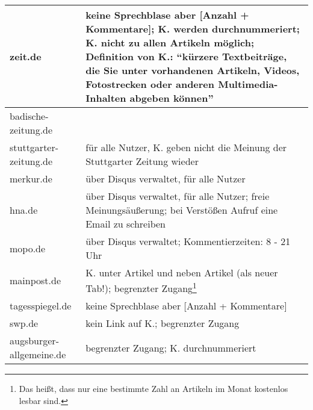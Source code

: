 \begin{longtable}{lp{10cm}}
zeit.de &
  keine Sprechblase aber [Anzahl + Kommentare]; K. werden durchnummeriert;  K.
  nicht zu allen Artikeln möglich; Definition von K.: ``kürzere Textbeiträge,
  die Sie unter vorhandenen Artikeln, Videos, Fotostrecken oder anderen
  Multimedia-Inhalten abgeben können'' \\\midrule

badische-zeitung.de &
  \\\midrule

stuttgarter-zeitung.de &
  für alle Nutzer, K. geben nicht die Meinung der Stuttgarter Zeitung
  wieder\\\midrule

merkur.de &
  über Disqus verwaltet, für alle Nutzer\\\midrule

hna.de &
  über Disqus verwaltet, für alle Nutzer; freie Meinungsäußerung; bei Verstößen
  Aufruf eine Email zu schreiben \\\midrule

mopo.de &
  über Disqus verwaltet; Kommentierzeiten: 8 - 21 Uhr\\\midrule

mainpost.de &
  K. unter Artikel und neben Artikel (als neuer Tab!); begrenzter
  Zugang\footnote{Das heißt, dass nur eine bestimmte Zahl an Artikeln im Monat
  kostenlos lesbar sind.}\\\midrule

tagesspiegel.de &
  keine Sprechblase aber [Anzahl + Kommentare]\\\midrule

swp.de &
  kein Link auf K.; begrenzter Zugang\\\midrule

augsburger-allgemeine.de &
  begrenzter Zugang; K. durchnummeriert

\end{longtable}
\endgroup

